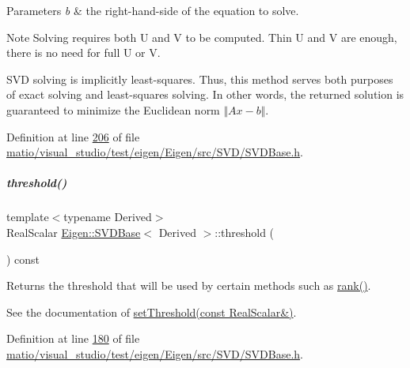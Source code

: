\begin{DoxyParams}{Parameters}
{\em b} & the right-\/hand-\/side of the equation to solve.\\
\hline
\end{DoxyParams}
\begin{DoxyNote}{Note}
Solving requires both U and V to be computed. Thin U and V are enough, there is no need for full U or V.

S\+VD solving is implicitly least-\/squares. Thus, this method serves both purposes of exact solving and least-\/squares solving. In other words, the returned solution is guaranteed to minimize the Euclidean norm $ \Vert A x - b \Vert $. 
\end{DoxyNote}


Definition at line \hyperlink{matio_2visual__studio_2test_2eigen_2_eigen_2src_2_s_v_d_2_s_v_d_base_8h_source_l00206}{206} of file \hyperlink{matio_2visual__studio_2test_2eigen_2_eigen_2src_2_s_v_d_2_s_v_d_base_8h_source}{matio/visual\+\_\+studio/test/eigen/\+Eigen/src/\+S\+V\+D/\+S\+V\+D\+Base.\+h}.

\mbox{\label{group___s_v_d___module_a98b2ee98690358951807353812a05c69}} 
\subparagraph{\texorpdfstring{threshold()}{threshold()}\hspace{0.1cm}{\footnotesize\ttfamily [1/2]}}
{\footnotesize\ttfamily template$<$typename Derived$>$ \\
Real\+Scalar \hyperlink{group___s_v_d___module_class_eigen_1_1_s_v_d_base}{Eigen\+::\+S\+V\+D\+Base}$<$ Derived $>$\+::threshold (\begin{DoxyParamCaption}{ }\end{DoxyParamCaption}) const\hspace{0.3cm}{\ttfamily [inline]}}

Returns the threshold that will be used by certain methods such as \hyperlink{group___s_v_d___module_a30b89e24f42f1692079eea31b361d26a}{rank()}.

See the documentation of \hyperlink{group___s_v_d___module_a1c95d05398fc15e410a28560ef70a5a6}{set\+Threshold(const Real\+Scalar\&)}. 

Definition at line \hyperlink{matio_2visual__studio_2test_2eigen_2_eigen_2src_2_s_v_d_2_s_v_d_base_8h_source_l00180}{180} of file \hyperlink{matio_2visual__studio_2test_2eigen_2_eigen_2src_2_s_v_d_2_s_v_d_base_8h_source}{matio/visual\+\_\+studio/test/eigen/\+Eigen/src/\+S\+V\+D/\+S\+V\+D\+Base.\+h}.

